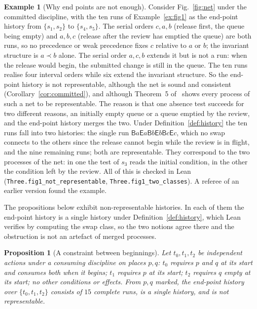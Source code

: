 \documentclass[preprint,12pt]{elsarticle}
\theoremstyle{plain}
\newtheorem{proposition}[theorem]{Proposition}
\theoremstyle{definition}
\newtheorem{example}[theorem]{Example}
\newcommand{\B}[1]{\mathsf{B}#1}
\newcommand{\E}[1]{\mathsf{E}#1}
\newcommand{\lean}[1]{\texttt{#1}}
\begin{document}
\begin{example}[Why end points are not enough]
\label{ex:fig1-history}
Consider Fig.~\ref{fig:net} under the committed discipline, with the ten runs of Example~\ref{ex:fig1} as the end-point history from $\{s_1, s_2\}$ to $\{s_4, s_5\}$. The serial orders $c, a, b$ (release first, the queue being empty) and $a, b, c$ (release after the review has emptied the queue) are both runs, so no precedence or weak precedence fixes $c$ relative to $a$ or $b$; the invariant structure is $a \prec b$ alone. The serial order $a, c, b$ extends it but is not a run: when the release would begin, the submitted change is still in the queue. The ten runs realise four interval orders while six extend the invariant structure. So the end-point history is not representable, although the net is sound and consistent (Corollary~\ref{cor:committed}), and although Theorem~5 of~\cite{AlqarniJanicki2018} shows every process of such a net to be representable. The reason is that one absence test succeeds for two different reasons, an initially empty queue or a queue emptied by the review, and the end-point history merges the two. Under Definition~\ref{def:history} the ten runs fall into two histories: the single run $\B{a}\E{a}\B{b}\E{b}\B{c}\E{c}$, which no swap connects to the others since the release cannot begin while the review is in flight, and the nine remaining runs; both are representable. They correspond to the two processes of the net: in one the test of $s_3$ reads the initial condition, in the other the condition left by the review. All of this is checked in Lean (\lean{Three.fig1\_not\_representable}, \lean{Three.fig1\_two\_classes}). A referee of an earlier version found the example.
\end{example}

The propositions below exhibit non-representable histories. In each of them the end-point history is a single history under Definition~\ref{def:history}, which Lean verifies by computing the swap class, so the two notions agree there and the obstruction is not an artefact of merged processes.

\begin{proposition}[A constraint between beginnings]
\label{prop:beginbegin}
Let $t_0, t_1, t_2$ be independent actions under a consuming discipline on places $p, q$: $t_0$ requires $p$ and $q$ at its start and consumes both when it begins; $t_1$ requires $p$ at its start; $t_2$ requires $q$ empty at its start; no other conditions or effects. From $p, q$ marked, the end-point history over $\{t_0, t_1, t_2\}$ consists of $15$ complete runs, is a single history, and is not representable.
\end{proposition}
\end{document}
